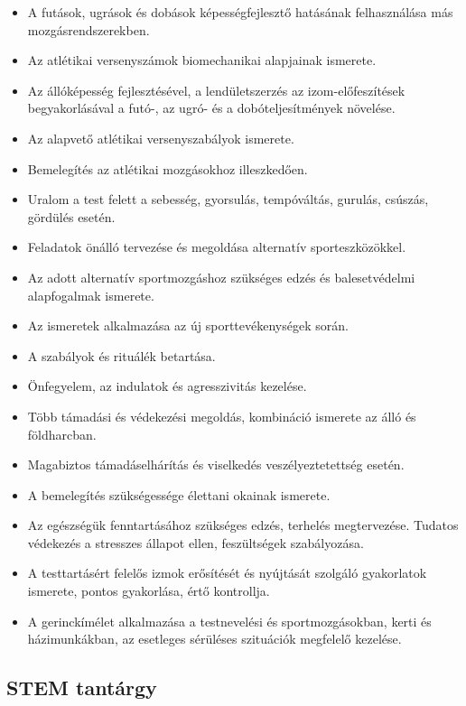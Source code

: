 \begin{itemize}
\item A futások, ugrások és dobások képességfejlesztő hatásának felhasználása más mozgásrendszerekben.
\item Az atlétikai versenyszámok biomechanikai alapjainak ismerete.
\item Az állóképesség fejlesztésével, a lendületszerzés az izom-előfeszítések begyakorlásával a futó-, az ugró- és a dobóteljesítmények növelése.
\item Az alapvető atlétikai versenyszabályok ismerete.
\item Bemelegítés az atlétikai mozgásokhoz illeszkedően.
\item Uralom a test felett a sebesség, gyorsulás, tempóváltás, gurulás, csúszás, gördülés esetén.
\item Feladatok önálló tervezése és megoldása alternatív sporteszközökkel.
\item Az adott alternatív sportmozgáshoz szükséges edzés és balesetvédelmi alapfogalmak ismerete.
\item Az ismeretek alkalmazása az új sporttevékenységek során.
\item A szabályok és rituálék betartása.
\item Önfegyelem, az indulatok és agresszivitás kezelése.
\item Több támadási és védekezési megoldás, kombináció ismerete az álló és földharcban.
\item Magabiztos támadáselhárítás és viselkedés veszélyeztetettség esetén.
\item A bemelegítés szükségessége élettani okainak ismerete.
\item Az egészségük fenntartásához szükséges edzés, terhelés megtervezése. Tudatos védekezés a stresszes állapot ellen, feszültségek szabályozása.
\item A testtartásért felelős izmok erősítését és nyújtását szolgáló gyakorlatok ismerete, pontos gyakorlása, értő kontrollja.
\item A gerinckímélet alkalmazása a testnevelési és sportmozgásokban, kerti és házimunkákban, az esetleges sérüléses szituációk megfelelő kezelése.
\end{itemize}
\subsection{STEM tantárgy}
